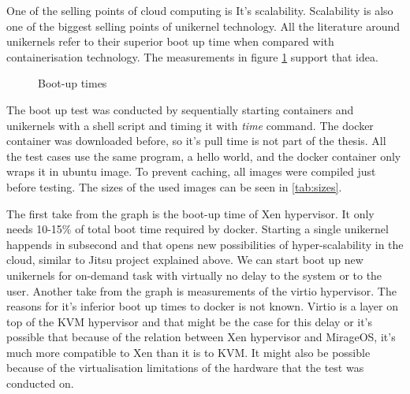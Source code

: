 One of the selling points of cloud computing is It's scalability. Scalability is also one of the biggest selling points of unikernel technology. All the literature around unikernels refer to their superior boot up time when compared with containerisation technology. The measurements in figure \ref{fig:boot-up} support that idea. 
\begin{figure}[htpb]
  \centering
    \caption{Boot-up times}\label{fig:boot-up}
  \end{figure}

The boot up test was conducted by sequentially starting containers and unikernels with a shell script and timing it with \textit{time} command. The docker container was downloaded before, so it's pull time is not part of the thesis. All the test cases use the same program, a hello world, and the docker container only wraps it in ubuntu image. To prevent caching, all images were compiled just before testing. The sizes of the used images can be seen in \ref{tab:sizes}.

The first take from the graph is the boot-up time of Xen hypervisor. It only needs 10-15\% of total boot time required by docker. Starting a single unikernel happends in subsecond and that opens new possibilities of hyper-scalability in the cloud, similar to Jitsu project explained above. We can start boot up new unikernels for on-demand task with virtually no delay to the system or to the user. Another take from the graph is measurements of the virtio\cite{virtio} hypervisor. The reasons for it's inferior boot up times to docker is not known. Virtio is a layer on top of the KVM hypervisor and that might be the case for this delay or it's possible that because of the relation between Xen hypervisor and MirageOS, it's much more compatible to Xen than it is to KVM. It might also be possible because of the virtualisation limitations of the hardware that the test was conducted on.

